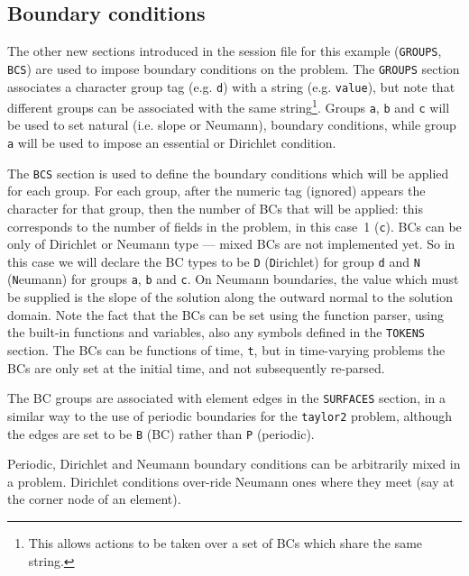 \documentclass[11pt,a4paper]{report}
\begin{document}
\subsection{Boundary conditions}

The other new sections introduced in the session file for this example
(\texttt{GROUPS}, \texttt{BCS}) are used to impose boundary conditions
on the problem.  The \texttt{GROUPS} section associates a character
group tag (e.g. \verb+d+) with a string (e.g. \verb+value+), but note
that different groups can be associated with the same
string\footnote{This allows actions to be taken over a set of BCs
which share the same string.}.  Groups \verb+a+, \verb+b+ and \verb+c+
will be used to set natural (i.e. slope or Neumann), boundary
conditions, while group \verb+a+ will be used to impose an essential
or Dirichlet condition.

The \texttt{BCS} section is used to define the boundary conditions
which will be applied for each group.  For each group, after the
numeric tag (ignored) appears the character for that group, then the
number of BCs that will be applied: this corresponds to the number of
fields in the problem, in this case~1 (\verb+c+).  BCs can be only of
Dirichlet or Neumann type --- mixed BCs are not implemented yet.  So
in this case we will declare the BC types to be \verb+D+ ({\texttt
D}irichlet) for group \verb+d+ and \verb+N+ ({\texttt N}eumann) for
groups \verb+a+, \verb+b+ and \verb+c+.  On Neumann boundaries, the
value which must be supplied is the slope of the solution along the
outward normal to the solution domain.  Note the fact that the BCs can
be set using the function parser, using the built-in functions and
variables, also any symbols defined in the \texttt{TOKENS} section.
The BCs can be functions of time, \verb+t+, but in time-varying
problems the BCs are only set at the initial time, and not
subsequently re-parsed.

The BC groups are associated with element edges in the \texttt{SURFACES}
section, in a similar way to the use of periodic boundaries for the
\texttt{taylor2} problem, although the edges are set to be \verb+B+ (BC)
rather than \verb+P+ (periodic).

Periodic, Dirichlet and Neumann boundary conditions can be arbitrarily
mixed in a problem.  Dirichlet conditions over-ride Neumann ones where
they meet (say at the corner node of an element).

\end{document}
